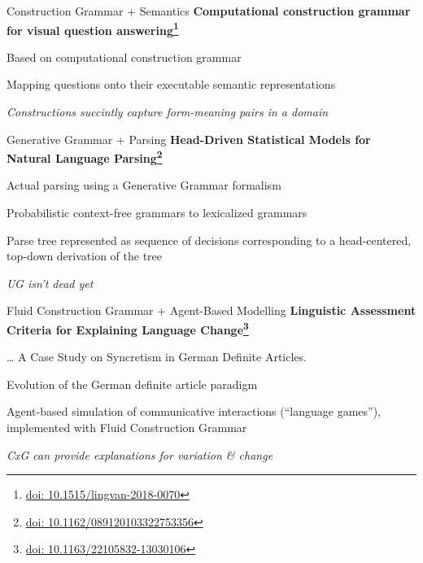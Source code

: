 \documentclass[aspectratio=169,cramped]{beamer}
\let\tempone\itemize
\let\temptwo\enditemize
\renewenvironment{itemize}{\tempone\addtolength{\itemsep}{-0\baselineskip}\addtolength{\parskip}{-0.2\baselineskip}}{\temptwo}
\newcommand*{\doi}[1]{\href{http://doai.io/#1}{doi: #1}}
\begin{document}
\begin{frame}{Construction Grammar + Semantics}
	\textbf{Computational construction grammar for visual question answering\footnote{\protect\doi{10.1515/lingvan-2018-0070}}}
  \begin{itemize}
  \item Based on computational construction grammar
  \item Mapping questions onto their executable semantic representations
  \item \textit{Constructions succintly capture form-meaning pairs in a domain}
  \end{itemize}
\end{frame}

\begin{frame}{Generative Grammar + Parsing}
	\textbf{Head-Driven Statistical Models for Natural Language Parsing\footnote{\protect\doi{10.1162/089120103322753356}}}
  \begin{itemize}
  \item Actual parsing using a Generative Grammar formalism
  \item Probabilistic context-free grammars to lexicalized grammars
  \item Parse tree represented as sequence of decisions corresponding to a head-centered,
    top-down derivation of the tree
  \item \textit{UG isn't dead yet}
  \end{itemize}
\end{frame}

\begin{frame}{Fluid Construction Grammar + Agent-Based Modelling}
	\textbf{Linguistic Assessment Criteria for Explaining Language Change\footnote{\protect\doi{10.1163/22105832-13030106}}}
  \begin{itemize}
  \item \ldots{} A Case Study on Syncretism in German Definite Articles.%
  \item Evolution of the German definite article paradigm
  \item Agent-based simulation of communicative interactions (``language games''), implemented with
    Fluid Construction Grammar
  \item \textit{CxG can provide explanations for variation \& change}
  \end{itemize}
\end{frame}
\end{document}
